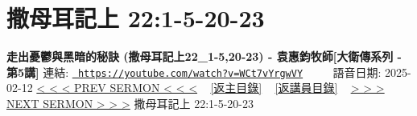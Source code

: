 \documentclass{book}
\begin{document}
\section{撒母耳記上 22:1-5-20-23}
\label{sec:WCt7vYrgwVY}
\textbf{走出憂鬱與黑暗的秘訣 (撒母耳記上22\_1-5,20-23) - 袁惠鈞牧師[大衛傳系列 - 第5講]}
\newline
\newline
連結: \href{https://youtube.com/watch?v=WCt7vYrgwVY}{\texttt{ https://youtube.com/watch?v=WCt7vYrgwVY}} ~~~~ 語音日期: 2025-02-12 
\newline
\newline
\hyperref[sec:rN0dS2BBBmc]{< < < PREV SERMON < < <}
~
\hyperlink{toc}{[返主目錄]}
~
\hyperref[ch:preacher6]{[返講員目錄]}
~
\hyperref[sec:GqTOPwqfjwM]{> > > NEXT SERMON > > >}
\newline
\newline
撒母耳記上 22:1-5-20-23
\newline
\end{document}

